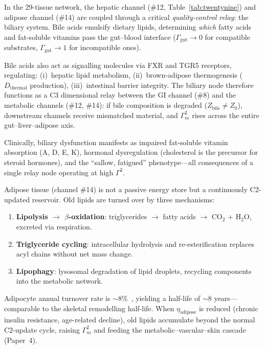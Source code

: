 \documentclass[aps,pre,twocolumn,superscriptaddress,floatfix]{revtex4-2}
\begin{document}
\begin{remark}
\label{rem:bile-relay}
In the 29-tissue network, the hepatic channel
(\#12, Table~\ref{tab:twentynine}) and adipose channel
(\#14) are coupled through a critical
\emph{quality-control relay}: the biliary system.
Bile acids emulsify dietary lipids, determining
\emph{which} fatty acids and fat-soluble vitamins
pass the gut--blood interface
($\Gamma_{\text{gut}} \to 0$ for compatible substrates,
$\Gamma_{\text{gut}} \to 1$ for incompatible ones).

Bile acids also act as signalling molecules via
FXR and TGR5 receptors, regulating:
(i)~hepatic lipid metabolism,
(ii)~brown-adipose thermogenesis
($D_{\text{thermal}}$ production),
(iii)~intestinal barrier integrity.
The biliary node therefore functions as a
C3 dimensional relay between the GI channel (\#8)
and the metabolic channels (\#12, \#14):
if bile composition is degraded
($Z_{\text{bile}} \neq Z_0$), downstream channels
receive mismatched material, and
$\Gamma_m^2$ rises across the entire
gut--liver--adipose axis.

Clinically, biliary dysfunction manifests as
impaired fat-soluble vitamin absorption (A, D, E, K),
hormonal dysregulation (cholesterol is the precursor
for steroid hormones), and the ``sallow, fatigued''
phenotype---all consequences of a single relay node
operating at high $\Gamma^2$.
\end{remark}

\begin{remark}
\label{rem:adipose-c2}
Adipose tissue (channel \#14) is not a passive
energy store but a continuously C2-updated reservoir.
Old lipids are turned over by three mechanisms:
\begin{enumerate}
  \item \textbf{Lipolysis $\to$ $\beta$-oxidation}:
    triglycerides $\to$ fatty acids $\to$
    CO$_2$ + H$_2$O, excreted via respiration.
  \item \textbf{Triglyceride cycling}:
    intracellular hydrolysis and re-esterification
    replaces acyl chains without net mass change.
  \item \textbf{Lipophagy}: lysosomal degradation of
    lipid droplets, recycling components into
    the metabolic network.
\end{enumerate}
Adipocyte annual turnover rate is
$\sim$8\%~\cite{Spalding2008},
yielding a half-life of $\sim$8 years---comparable
to the skeletal remodelling half-life.
When $\eta_{\text{adipose}}$ is reduced
(chronic insulin resistance, age-related decline),
old lipids accumulate beyond the normal C2-update
cycle, raising $\Gamma_m^2$ and feeding the
metabolic--vascular--skin cascade (Paper~4).
\end{remark}
\end{document}

